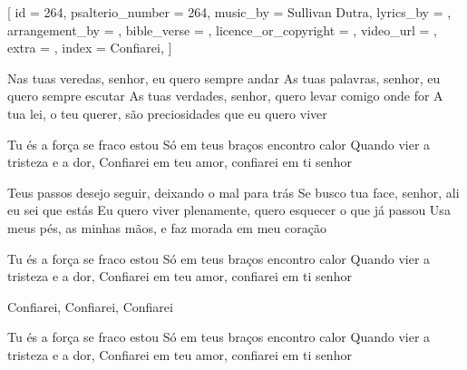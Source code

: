 [
    id                     = {264},
    psalterio_number       = {264},
    music_by               = {Sullivan Dutra},
    lyrics_by              = {},
    arrangement_by         = {},
    bible_verse            = {},
    licence_or_copyright   = {},
    video_url              = {},
    extra                  = {},
    index                  = {Confiarei},
]


\beginverse
Nas tuas veredas, senhor, eu quero sempre andar
As tuas palavras, senhor, eu quero sempre escutar
As tuas verdades, senhor, quero levar comigo onde for
A tua lei, o teu querer, são preciosidades que eu quero viver
\endverse


\beginchorus
Tu és a força se fraco estou
Só em teus braços encontro calor
Quando vier a tristeza e a dor,
Confiarei em teu amor, confiarei em ti senhor
\endchorus


\beginverse
Teus passos desejo seguir, deixando o mal para trás
Se busco tua face, senhor, ali eu sei que estás
Eu quero viver plenamente, quero esquecer o que já passou
Usa meus pés, as minhas mãos, e faz morada em meu coração
\endverse


\beginchorus
Tu és a força se fraco estou
Só em teus braços encontro calor
Quando vier a tristeza e a dor,
Confiarei em teu amor, confiarei em ti senhor
\endchorus


\beginverse
Confiarei, Confiarei, Confiarei
\endverse


\beginchorus
Tu és a força se fraco estou
Só em teus braços encontro calor
Quando vier a tristeza e a dor,
Confiarei em teu amor, confiarei em ti senhor
\endchorus

\endsong
